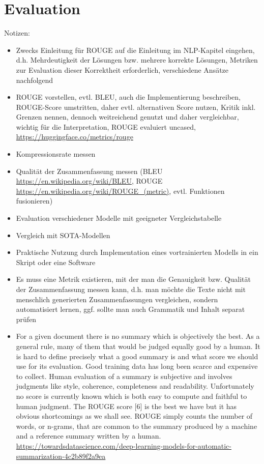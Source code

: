 \section{Evaluation}
Notizen:
\begin{itemize}
	\item Zwecks Einleitung für ROUGE auf die Einleitung im NLP-Kapitel eingehen, d.h. Mehrdeutigkeit der Lösungen bzw. mehrere korrekte Lösungen, Metriken zur Evaluation dieser Korrektheit erforderlich, verschiedene Ansätze nachfolgend
	\item ROUGE vorstellen, evtl. BLEU, auch die Implementierung beschreiben, ROUGE-Score umstritten, daher evtl. alternativen Score nutzen, Kritik inkl. Grenzen nennen, dennoch weitreichend genutzt und daher vergleichbar, wichtig für die Interpretation, ROUGE evaluiert uncased, \url{https://huggingface.co/metrics/rouge}
	\item Kompressionsrate messen
	\item Qualität der Zusammenfassung messen (BLEU \url{https://en.wikipedia.org/wiki/BLEU}, ROUGE \url{https://en.wikipedia.org/wiki/ROUGE_(metric)}, evtl. Funktionen fusionieren)
	\item Evaluation verschiedener Modelle mit geeigneter Vergleichstabelle
	\item Vergleich mit SOTA-Modellen
	\item Praktische Nutzung durch Implementation eines vortrainierten Modells in ein Skript oder eine Software
	\item Es muss eine Metrik existieren, mit der man die Genauigkeit bzw. Qualität der Zusammenfassung messen kann, d.h. man möchte die Texte nicht mit menschlich generierten Zusammenfassungen vergleichen, sondern automatisiert lernen, ggf. sollte man auch Grammatik und Inhalt separat prüfen
	\item For a given document there is no summary which is objectively the best. As a general rule, many of them that would be judged equally good by a human. It is hard to define precisely what a good summary is and what score we should use for its evaluation. Good training data has long been scarce and expensive to collect. Human evaluation of a summary is subjective and involves judgments like style, coherence, completeness and readability. Unfortunately no score is currently known which is both easy to compute and faithful to human judgment. The ROUGE score [6] is the best we have but it has obvious shortcomings as we shall see. ROUGE simply counts the number of words, or n-grams, that are common to the summary produced by a machine and a reference summary written by a human. \url{https://towardsdatascience.com/deep-learning-models-for-automatic-summarization-4c2b89f2a9ea}

\end{itemize}
